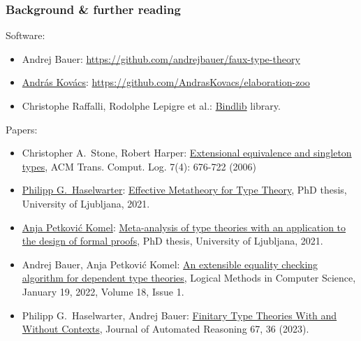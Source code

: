 \documentclass[handout,11pt,aspectratio=169]{beamer}
\begin{document}
\begin{frame}
  \frametitle{Background \& further reading}

  \footnotesize

  Software:
  \begin{itemize}
  \item Andrej Bauer: \url{https://github.com/andrejbauer/faux-type-theory}
  \item \href{https://andraskovacs.github.io}{András Kovács}: \url{https://github.com/AndrasKovacs/elaboration-zoo}
  \item Christophe Raffalli, Rodolphe Lepigre et al.: \href{https://ocaml.org/p/bindlib/6.0.0}{Bindlib} library.
  \end{itemize}
  Papers:
  \begin{itemize}
  \item Christopher A.~Stone, Robert Harper: \href{https://doi.org/10.1145/1183278.1183281}{Extensional equivalence and
      singleton types}, ACM Trans. Comput. Log. 7(4): 676-722 (2006)
  \item \href{https://haselwarter.org}{Philipp G.~Haselwarter}: \href{https://haselwarter.org/assets/pdfs/effective-metatheory-for-type-theory.pdf}{Effective Metatheory for Type
      Theory}, PhD thesis, University of Ljubljana, 2021.
  \item \href{https://anjapetkovic.com}{Anja Petković Komel}: \href{https://anjapetkovic.com/\#phd}{Meta-analysis of type theories with an application to the design of formal proofs}, PhD thesis, University of Ljubljana, 2021.
  \item Andrej Bauer, Anja Petković Komel: \href{https://doi.org/10.46298/lmcs-18\%281\%3A17\%292022}{An extensible equality checking algorithm for dependent type theories}, Logical Methods in Computer Science, January 19, 2022, Volume 18, Issue 1.
  \item Philipp G.~Haselwarter, Andrej Bauer: \href{https://doi.org/10.1007/s10817-023-09678-y}{Finitary Type Theories With and Without Contexts}, Journal of Automated Reasoning 67, 36 (2023).
  \end{itemize}
\end{frame}
\end{document}
